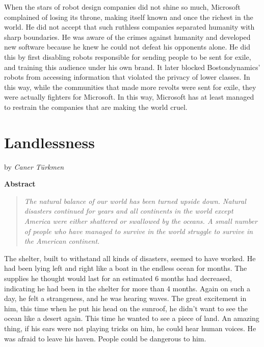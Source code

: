 \documentclass[]{book}
\begin{document}
When the stars of robot design companies did not shine so much, Microsoft complained of losing its throne, making itself known and once the richest in the world. He did not accept that such ruthless companies separated humanity with sharp boundaries. He was aware of the crimes against humanity and developed new software because he knew he could not defeat his opponents alone. He did this by first disabling robots responsible for sending people to be sent for exile, and training this audience under his own brand. It later blocked Bostondynamics' robots from accessing information that violated the privacy of lower classes. In this way, while the communities that made more revolts were sent for exile, they were actually fighters for Microsoft. In this way, Microsoft has at least managed to restrain the companies that are making the world cruel.

\hypertarget{landlessness}{%
\chapter{Landlessness}\label{landlessness}}

by \emph{Caner Türkmen}

\textbf{Abstract}

\begin{quote}
\emph{The natural balance of our world has been turned upside down. Natural disasters continued for years and all continents in the world except America were either shattered or swallowed by the oceans. A small number of people who have managed to survive in the world struggle to survive in the American continent.}
\end{quote}

The shelter, built to withstand all kinds of disasters, seemed to have worked. He had been lying left and right like a boat in the endless ocean for months. The supplies he thought would last for an estimated 6 months had decreased, indicating he had been in the shelter for more than 4 months. Again on such a day, he felt a strangeness, and he was hearing waves. The great excitement in him, this time when he put his head on the sunroof, he didn't want to see the ocean like a desert again. This time he wanted to see a piece of land. An amazing thing, if his ears were not playing tricks on him, he could hear human voices. He was afraid to leave his haven. People could be dangerous to him.
\end{document}
